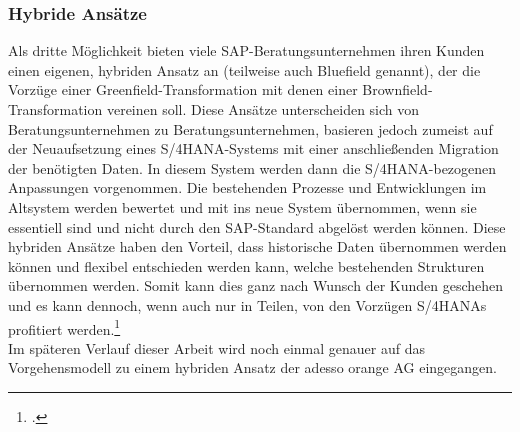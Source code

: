 \subsubsection{Hybride Ansätze}
Als dritte Möglichkeit bieten viele SAP-Beratungsunternehmen ihren Kunden einen eigenen, hybriden Ansatz an (teilweise auch \glqq{}Bluefield\grqq{} genannt), der die Vorzüge einer Greenfield-Transformation mit denen einer Brownfield-Transformation vereinen soll. Diese Ansätze unterscheiden sich von Beratungsunternehmen zu Beratungsunternehmen, basieren jedoch zumeist auf der Neuaufsetzung eines S/4HANA-Systems mit einer anschließenden Migration der benötigten Daten. In diesem System werden dann die S/4HANA-bezogenen Anpassungen vorgenommen. Die bestehenden Prozesse und Entwicklungen im Altsystem werden bewertet und mit ins neue System übernommen, wenn sie essentiell sind und nicht durch den SAP-Standard abgelöst werden können. Diese hybriden Ansätze haben den Vorteil, dass historische Daten übernommen werden können und flexibel entschieden werden kann, welche bestehenden Strukturen übernommen werden. Somit kann dies ganz nach Wunsch der Kunden geschehen und es kann dennoch, wenn auch nur in Teilen, von den Vorzügen S/4HANAs profitiert werden.\footcite[Vgl.][]{hybrideransatz}\\
Im späteren Verlauf dieser Arbeit wird noch einmal genauer auf das Vorgehensmodell zu einem hybriden Ansatz der \glqq{}adesso orange AG\grqq{} eingegangen.
